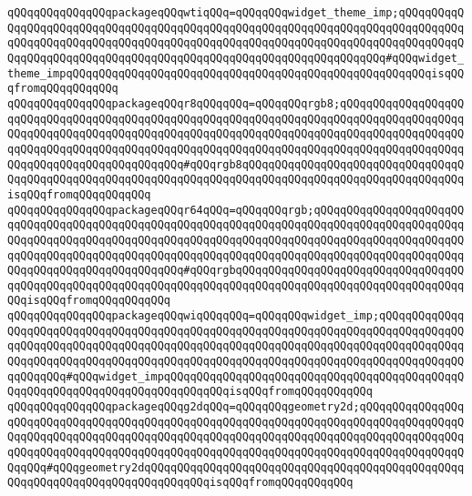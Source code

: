 \verb|qQQqqQQqqQQqqQQqpackageqQQqwtiqQQq=qQQqqQQqwidget_theme_imp;qQQqqQQqqQQqqQQqqQQqqQQqqQQqqQQqqQQqqQQqqQQqqQQqqQQqqQQqqQQqqQQqqQQqqQQqqQQqqQQqqQQqqQQqqQQqqQQqqQQqqQQqqQQqqQQqqQQqqQQqqQQqqQQqqQQqqQQqqQQqqQQqqQQqqQQqqQQqqQQqqQQqqQQqqQQqqQQqqQQqqQQqqQQqqQQqqQQqqQQqqQQqqQQq#qQQqwidget_theme_impqQQqqQQqqQQqqQQqqQQqqQQqqQQqqQQqqQQqqQQqqQQqqQQqqQQqqQQqisqQQqfromqQQqqQQqqQQq|\newline
\verb|qQQqqQQqqQQqqQQqpackageqQQqr8qQQqqQQq=qQQqqQQqrgb8;qQQqqQQqqQQqqQQqqQQqqQQqqQQqqQQqqQQqqQQqqQQqqQQqqQQqqQQqqQQqqQQqqQQqqQQqqQQqqQQqqQQqqQQqqQQqqQQqqQQqqQQqqQQqqQQqqQQqqQQqqQQqqQQqqQQqqQQqqQQqqQQqqQQqqQQqqQQqqQQqqQQqqQQqqQQqqQQqqQQqqQQqqQQqqQQqqQQqqQQqqQQqqQQqqQQqqQQqqQQqqQQqqQQqqQQqqQQqqQQqqQQqqQQqqQQqqQQq#qQQqrgb8qQQqqQQqqQQqqQQqqQQqqQQqqQQqqQQqqQQqqQQqqQQqqQQqqQQqqQQqqQQqqQQqqQQqqQQqqQQqqQQqqQQqqQQqqQQqqQQqqQQqqQQqisqQQqfromqQQqqQQqqQQq|\newline
\verb|qQQqqQQqqQQqqQQqpackageqQQqr64qQQq=qQQqqQQqrgb;qQQqqQQqqQQqqQQqqQQqqQQqqQQqqQQqqQQqqQQqqQQqqQQqqQQqqQQqqQQqqQQqqQQqqQQqqQQqqQQqqQQqqQQqqQQqqQQqqQQqqQQqqQQqqQQqqQQqqQQqqQQqqQQqqQQqqQQqqQQqqQQqqQQqqQQqqQQqqQQqqQQqqQQqqQQqqQQqqQQqqQQqqQQqqQQqqQQqqQQqqQQqqQQqqQQqqQQqqQQqqQQqqQQqqQQqqQQqqQQqqQQqqQQqqQQqqQQqqQQq#qQQqrgbqQQqqQQqqQQqqQQqqQQqqQQqqQQqqQQqqQQqqQQqqQQqqQQqqQQqqQQqqQQqqQQqqQQqqQQqqQQqqQQqqQQqqQQqqQQqqQQqqQQqqQQqqQQqisqQQqfromqQQqqQQqqQQq|\newline
\verb|qQQqqQQqqQQqqQQqpackageqQQqwiqQQqqQQq=qQQqqQQqwidget_imp;qQQqqQQqqQQqqQQqqQQqqQQqqQQqqQQqqQQqqQQqqQQqqQQqqQQqqQQqqQQqqQQqqQQqqQQqqQQqqQQqqQQqqQQqqQQqqQQqqQQqqQQqqQQqqQQqqQQqqQQqqQQqqQQqqQQqqQQqqQQqqQQqqQQqqQQqqQQqqQQqqQQqqQQqqQQqqQQqqQQqqQQqqQQqqQQqqQQqqQQqqQQqqQQqqQQqqQQqqQQqqQQqqQQqqQQq#qQQqwidget_impqQQqqQQqqQQqqQQqqQQqqQQqqQQqqQQqqQQqqQQqqQQqqQQqqQQqqQQqqQQqqQQqqQQqqQQqqQQqqQQqisqQQqfromqQQqqQQqqQQq|\newline
\verb|qQQqqQQqqQQqqQQqpackageqQQqg2dqQQq=qQQqqQQqgeometry2d;qQQqqQQqqQQqqQQqqQQqqQQqqQQqqQQqqQQqqQQqqQQqqQQqqQQqqQQqqQQqqQQqqQQqqQQqqQQqqQQqqQQqqQQqqQQqqQQqqQQqqQQqqQQqqQQqqQQqqQQqqQQqqQQqqQQqqQQqqQQqqQQqqQQqqQQqqQQqqQQqqQQqqQQqqQQqqQQqqQQqqQQqqQQqqQQqqQQqqQQqqQQqqQQqqQQqqQQqqQQqqQQqqQQqqQQq#qQQqgeometry2dqQQqqQQqqQQqqQQqqQQqqQQqqQQqqQQqqQQqqQQqqQQqqQQqqQQqqQQqqQQqqQQqqQQqqQQqqQQqqQQqisqQQqfromqQQqqQQqqQQq|\newline
